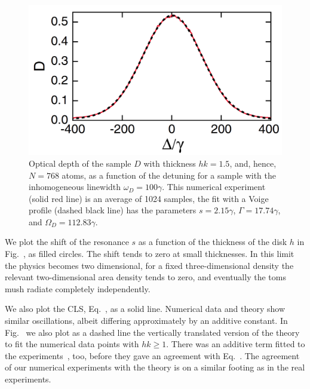 \begin{figure}[h!]
\begin{center}
\includegraphics[width=\textwidth]{inhomo_D.pdf}
\end{center}
\caption{Optical depth of the sample $D$ with thickness $hk=1.5$, and, hence, $N=768$ atoms, as a function of the detuning for a sample with the inhomogeneous linewidth $\omega_D=100\gamma$. This numerical experiment (solid red line) is an average of 1024 samples, the fit with a Voige profile (dashed black line) has the parameters $s=2.15\gamma$, $\Gamma=17.74\gamma$, and $\Omega_D=112.83\gamma$.}
\label{INHOMO_D}
\end{figure}

We plot the shift of the resonance $s$ as a function of the thickness of the disk $h$ in Fig.~, as filled circles. The shift tends to zero at small thicknesses. In this limit the physics becomes two dimensional, for a fixed three-dimensional density the relevant two-dimensional area density tends to zero, and eventually the toms mush radiate completely independently. 

We also plot the CLS, Eq.~, as a solid line. Numerical data and theory show similar oscillations, albeit differing approximately by an additive constant. In Fig.~ we also plot as a dashed line the vertically translated version of the theory to fit the numerical data points with $hk\geq 1$. There was an additive term fitted to the experiments~\cite{PhysRevLett.108.173601}, too, before they gave an agreement with Eq.~. The agreement of our numerical experiments with the theory is on a similar footing as in the real experiments.


